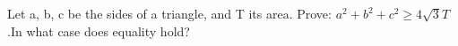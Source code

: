 \item Let a, b, c be the sides of a triangle, and T its area. Prove: $a^2+b^2+c^2 \geq 4\sqrt{3}T$.In what case does equality hold?

